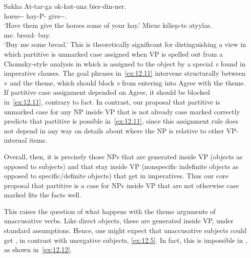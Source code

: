 \documentclass[output=paper]{langsci/langscibook}
\begin{document}
\ea\label{ex:12.11}Sakha
	\ea
		\gll At-tar-ga ok-kut-una bier-din-ner.\\
			horse-\Pl{}-\Dat{} hay-\Ssg{}P-\Part{} give-\Imp{}-\Tpl{}.\Sbj{}\\
		\glt ‘Have them give the horses some of your hay.’
	\ex
		\gll Miexe  kiliep-te atyylas.\\
			me.\Dat{}  bread-\Part{}  buy.\Imp{}\\
		\glt ‘Buy me some bread.’
	\z
\z
This is theoretically significant for distinguishing a view in which partitive
is unmarked case assigned when VP is spelled out from a Chomsky-style analysis
in which  is assigned to the object by a special \emph{v} found in
imperative clauses.  The goal phrases in~\eqref{ex:12.11} intervene structurally between v
and the theme, which should block \emph{v} from entering into Agree with the theme. If
partitive case assignment depended on Agree, it should be blocked in~\eqref{ex:12.11},
contrary to fact.  In contrast, our proposal that partitive is unmarked case
for any NP inside VP that is not already case marked correctly predicts that
partitive is possible in~\eqref{ex:12.11}, since this assignment rule does not depend in
any way on details about where the NP is relative to other VP-internal items.

Overall, then, it is precisely those NPs that are generated inside VP (objects
as opposed to subjects) and that stay inside VP (nonspecific indefinite objects
as opposed to specific/definite objects) that get  in
imperatives. Thus our core proposal that partitive is a case for NPs inside VP
that are not otherwise case marked fits the facts well.\largerpage[2]

This raises the question of what happens with the theme arguments of
unaccusative verbs.  Like direct objects, these are generated inside VP, under
standard assumptions.  Hence, one might expect that
unaccusative subjects could get , in
contrast with unergative subjects, \eqref{ex:12.5}. In
fact, this is impossible in , as shown in~\eqref{ex:12.12}.
\end{document}

